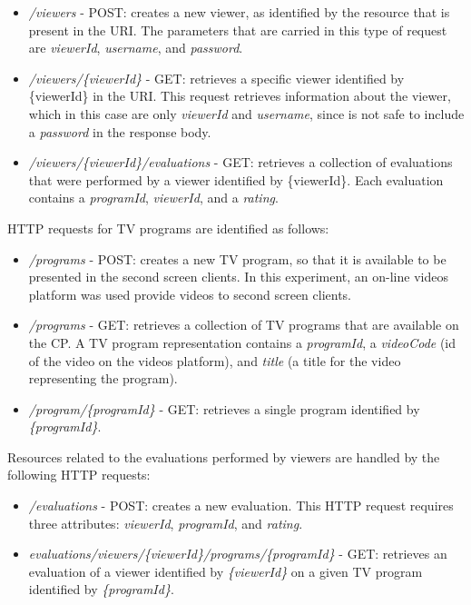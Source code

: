 \documentclass[journal]{IEEEtran}
\begin{document}
\begin{itemize}
	\item \emph{/viewers} - POST: creates a new viewer, as identified by the resource that is present in the URI. The parameters that are carried in this type of request are \emph{viewerId}, \emph{username}, and \emph{password}.
	\item \emph{/viewers/\{viewerId\}} - GET: retrieves a specific viewer identified by \{viewerId\} in the URI. This request retrieves information about the viewer, which in this case are only \emph{viewerId} and \emph{username}, since is not safe to include a \emph{password} in the response body.
	\item \emph{/viewers/\{viewerId\}/evaluations} - GET: retrieves a collection of evaluations that were performed by a viewer identified by \{viewerId\}. Each evaluation contains a \emph{programId}, \emph{viewerId}, and a \emph{rating}.
\end{itemize}

HTTP requests for TV programs are identified as follows:

\begin{itemize}
	\item \emph{/programs} - POST: creates a new TV program, so that it is available to be presented in the second screen clients. In this experiment, an on-line videos platform was used provide videos to second screen clients. 
	\item \emph{/programs} - GET: retrieves a collection of TV programs that are available on the CP. A TV program representation contains a \emph{programId}, a \emph{videoCode} (id of the video on the videos platform), and \emph{title} (a title for the video representing the program).
	\item \emph{/program/\{programId\}} - GET: retrieves a single program identified by \emph{\{programId\}}.
\end{itemize}

Resources related to the evaluations performed by viewers are handled by the following HTTP requests:

\begin{itemize}
	\item \emph{/evaluations} - POST: creates a new evaluation. This HTTP request requires three attributes: \emph{viewerId}, \emph{programId}, and \emph{rating}.
	\item \emph{evaluations/viewers/\{viewerId\}/programs/\{programId\}} - GET: retrieves an evaluation of a viewer identified by \emph{\{viewerId\}} on a given TV program identified by \emph{\{programId\}}.
\end{itemize}
\end{document}
